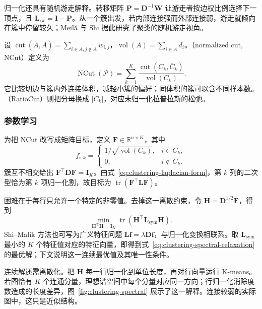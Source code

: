 归一化还具有随机游走解释。转移矩阵 $\bm{P}=\bm{D}^{-1}\bm{W}$ 让游走者按边权比例选择下一顶点，且 $\bm{L}_{\mathrm{rw}}=\bm{I}-\bm{P}$。从一个簇出发，若内部连接强而外部连接弱，游走就倾向在簇中停留较久；Meilă 与 Shi 据此研究了聚类的随机游走视角。

设 $\operatorname{cut}(A,\bar A)=\sum_{i\in A,j\notin A}w_{i,j}$，$\operatorname{vol}(A)=\sum_{i\in A}d_i$。（normalized cut, NCut）定义为
\begin{equation}
 \operatorname{NCut}(\mathcal{P})
 =\sum_{k=1}^K
 \frac{\operatorname{cut}(C_k,\bar C_k)}
      {\operatorname{vol}(C_k)}.
 \label{eq:clustering-ncut}
\end{equation}
它比较切边与簇内外连接体积，减轻小簇的偏好；同体积的簇可以含不同样本数。（RatioCut）则把分母换成 $|C_k|$，对应未归一化拉普拉斯的松弛。

\subsubsection{参数学习}

为把 NCut 改写成矩阵目标，定义 $\bm{F}\in\mathbb{R}^{n\times K}$，其中
\[
 f_{i,k}=
 \begin{cases}
  1/\sqrt{\operatorname{vol}(C_k)},&i\in C_k,\\
  0,&i\notin C_k.
 \end{cases}
\]
簇互不相交给出 $\bm{F}^{\top}\bm{D}\bm{F}=\bm{I}_K$。由式~\eqref{eq:clustering-laplacian-form}，第 $k$ 列的二次型恰为第 $k$ 项归一化割，故目标为 $\operatorname{tr}(\bm{F}^{\top}\bm{L}\bm{F})$。

困难在于每行只允许一个特定的非零值。去掉这一离散约束，令 $\bm{H}=\bm{D}^{1/2}\bm{F}$，得到
\begin{equation}
 \min_{\bm{H}^{\top}\bm{H}=\bm{I}_K}
 \operatorname{tr}(\bm{H}^{\top}
                   \bm{L}_{\mathrm{sym}}\bm{H}).
 \label{eq:clustering-spectral-relaxation}
\end{equation}
Shi--Malik 方法也可写为广义特征问题 $\bm{L}\bm{f}=\lambda\bm{D}\bm{f}$，与归一化变换相联系。取 $\bm{L}_{\mathrm{sym}}$ 最小的 $K$ 个特征值对应的特征向量，即得到式~\eqref{eq:clustering-spectral-relaxation} 的最优解；下文说明这一连续最优值及其唯一性条件。

连续解还需离散化。把 $\bm{H}$ 每一行归一化到单位长度，再对行向量运行 K-means。若图恰有 $K$ 个连通分量，理想谱空间中每个分量对应同一方向；行归一化消除度数造成的长度差异，图~\ref{fig:clustering-spectral} 展示了这一解释。连接较弱的实际图中，这只是近似结构。

